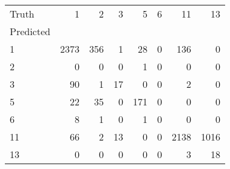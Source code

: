 \begin{tabular}{lrrrrrrr}
\toprule
Truth & 1 & 2 & 3 & 5 & 6 & 11 & 13 \\
Predicted &  &  &  &  &  &  &  \\
\midrule
1 & 2373 & 356 & 1 & 28 & 0 & 136 & 0 \\
2 & 0 & 0 & 0 & 1 & 0 & 0 & 0 \\
3 & 90 & 1 & 17 & 0 & 0 & 2 & 0 \\
5 & 22 & 35 & 0 & 171 & 0 & 0 & 0 \\
6 & 8 & 1 & 0 & 1 & 0 & 0 & 0 \\
11 & 66 & 2 & 13 & 0 & 0 & 2138 & 1016 \\
13 & 0 & 0 & 0 & 0 & 0 & 3 & 18 \\
\bottomrule
\end{tabular}
